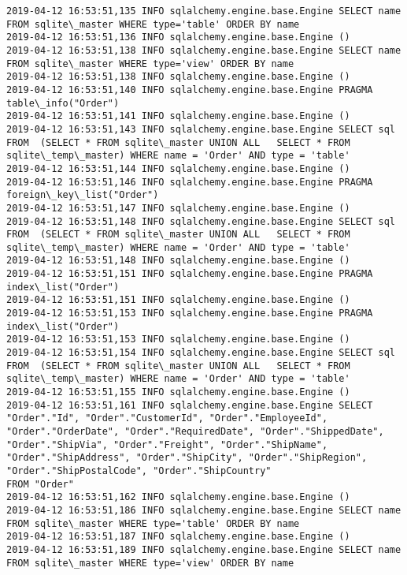 \documentclass[11pt]{article}
\begin{document}
    \begin{Verbatim}[commandchars=\\\{\}]
2019-04-12 16:53:51,135 INFO sqlalchemy.engine.base.Engine SELECT name FROM sqlite\_master WHERE type='table' ORDER BY name
2019-04-12 16:53:51,136 INFO sqlalchemy.engine.base.Engine ()
2019-04-12 16:53:51,138 INFO sqlalchemy.engine.base.Engine SELECT name FROM sqlite\_master WHERE type='view' ORDER BY name
2019-04-12 16:53:51,138 INFO sqlalchemy.engine.base.Engine ()
2019-04-12 16:53:51,140 INFO sqlalchemy.engine.base.Engine PRAGMA table\_info("Order")
2019-04-12 16:53:51,141 INFO sqlalchemy.engine.base.Engine ()
2019-04-12 16:53:51,143 INFO sqlalchemy.engine.base.Engine SELECT sql FROM  (SELECT * FROM sqlite\_master UNION ALL   SELECT * FROM sqlite\_temp\_master) WHERE name = 'Order' AND type = 'table'
2019-04-12 16:53:51,144 INFO sqlalchemy.engine.base.Engine ()
2019-04-12 16:53:51,146 INFO sqlalchemy.engine.base.Engine PRAGMA foreign\_key\_list("Order")
2019-04-12 16:53:51,147 INFO sqlalchemy.engine.base.Engine ()
2019-04-12 16:53:51,148 INFO sqlalchemy.engine.base.Engine SELECT sql FROM  (SELECT * FROM sqlite\_master UNION ALL   SELECT * FROM sqlite\_temp\_master) WHERE name = 'Order' AND type = 'table'
2019-04-12 16:53:51,148 INFO sqlalchemy.engine.base.Engine ()
2019-04-12 16:53:51,151 INFO sqlalchemy.engine.base.Engine PRAGMA index\_list("Order")
2019-04-12 16:53:51,151 INFO sqlalchemy.engine.base.Engine ()
2019-04-12 16:53:51,153 INFO sqlalchemy.engine.base.Engine PRAGMA index\_list("Order")
2019-04-12 16:53:51,153 INFO sqlalchemy.engine.base.Engine ()
2019-04-12 16:53:51,154 INFO sqlalchemy.engine.base.Engine SELECT sql FROM  (SELECT * FROM sqlite\_master UNION ALL   SELECT * FROM sqlite\_temp\_master) WHERE name = 'Order' AND type = 'table'
2019-04-12 16:53:51,155 INFO sqlalchemy.engine.base.Engine ()
2019-04-12 16:53:51,161 INFO sqlalchemy.engine.base.Engine SELECT "Order"."Id", "Order"."CustomerId", "Order"."EmployeeId", "Order"."OrderDate", "Order"."RequiredDate", "Order"."ShippedDate", "Order"."ShipVia", "Order"."Freight", "Order"."ShipName", "Order"."ShipAddress", "Order"."ShipCity", "Order"."ShipRegion", "Order"."ShipPostalCode", "Order"."ShipCountry" 
FROM "Order"
2019-04-12 16:53:51,162 INFO sqlalchemy.engine.base.Engine ()
2019-04-12 16:53:51,186 INFO sqlalchemy.engine.base.Engine SELECT name FROM sqlite\_master WHERE type='table' ORDER BY name
2019-04-12 16:53:51,187 INFO sqlalchemy.engine.base.Engine ()
2019-04-12 16:53:51,189 INFO sqlalchemy.engine.base.Engine SELECT name FROM sqlite\_master WHERE type='view' ORDER BY name

\end{Verbatim}
\end{document}
